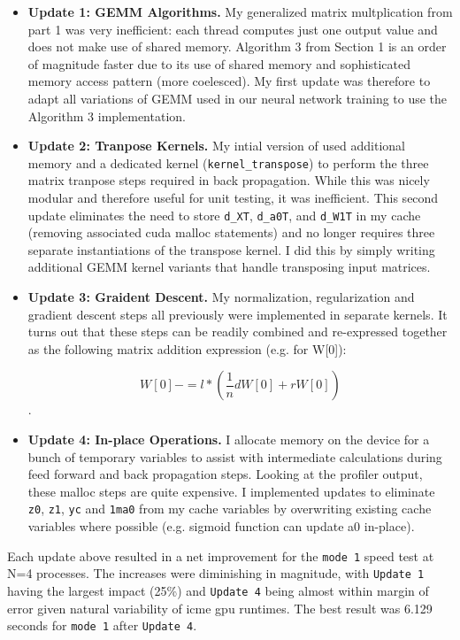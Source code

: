 \documentclass[12pt,letterpaper,twoside]{article}
\begin{document}
\begin{itemize}
    \item \textbf{Update 1: GEMM Algorithms.} My generalized matrix multplication
    from part 1 was very inefficient: each thread computes just one output value
    and does not make use of shared memory. Algorithm 3 from Section 1 is an order
    of magnitude faster due to its use of shared memory and sophisticated memory
    access pattern (more coelesced). My first update was therefore to adapt all
    variations of GEMM used in our neural network training to use the Algorithm
    3 implementation.

    \item \textbf{Update 2: Tranpose Kernels.} My intial version of used
    additional memory and a dedicated kernel (\texttt{kernel\_transpose}) to
    perform the three matrix tranpose steps required in back propagation.
    While this was nicely modular and therefore useful for unit testing,
    it was inefficient. This second update eliminates the need to store
    \texttt{d\_XT}, \texttt{d\_a0T}, and \texttt{d\_W1T} in my cache (removing
    associated cuda malloc statements) and no longer requires three separate
    instantiations of the transpose kernel. I did this by simply writing
    additional GEMM kernel variants that handle transposing input matrices.

    \item \textbf{Update 3: Graident Descent.} My normalization, regularization
    and gradient descent steps all previously were implemented in separate kernels.
    It turns out that these steps can be readily combined and re-expressed together
    as the following matrix addition expression (e.g. for W[0]):

    $$W[0] \mathrel{{-}{=}} l*(\frac{1}{n} dW[0] + r W[0])$$.

    \item \textbf{Update 4: In-place Operations.} I allocate memory on the device for
    a bunch of temporary variables to assist with intermediate calculations during
    feed forward and back propagation steps. Looking at the profiler output, these
    malloc steps are quite expensive. I implemented updates to eliminate \texttt{z0},
    \texttt{z1}, \texttt{yc} and \texttt{1ma0} from my cache variables by overwriting
    existing cache variables where possible (e.g. sigmoid function can update a0 in-place).
\end{itemize}

Each update above resulted in a net improvement for the \texttt{mode 1} speed test at
N=4 processes. The increases were diminishing in magnitude, with \texttt{Update 1}
having the largest impact (25\%) and \texttt{Update 4} being almost within margin
of error given natural variability of icme gpu runtimes. The best result was 6.129
seconds for \texttt{mode 1} after \texttt{Update 4}.
\end{document}
